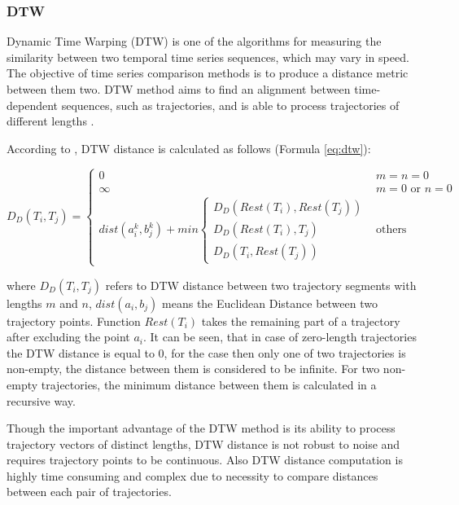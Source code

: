 \subsubsection{DTW}

Dynamic Time Warping (DTW) is one of the algorithms for measuring the similarity between two temporal time series sequences, which may vary in speed. The objective of time series comparison methods is to produce a distance metric between them two. DTW method aims to find an alignment between time-dependent sequences, such as trajectories, and is able to process trajectories of different lengths \cite{article:8_review_mot_cl_alg}. 

According to \cite{article:8_review_mot_cl_alg}, DTW distance is calculated as follows (Formula \ref{eq:dtw}):

\begin{equation} \label{eq:dtw}
	D_D(T_i, T_j) = 
		\begin{cases}
			0 				&\text{$m = n = 0$}\\
			\infty 			&\text{$m = 0$ or $n = 0$}\\
			dist(a_i^k, b_j^k) + min 
				\begin{cases}
					D_D(Rest(T_i), Rest(T_j))\\
					D_D(Rest(T_i), T_j)\\
					D_D(T_i, Rest(T_j))
				\end{cases} &\text{others}
		\end{cases}
\end{equation}

where $D_D(T_i, T_j)$ refers to DTW distance between two trajectory segments with lengths $m$ and $n$, $dist(a_i, b_j)$ means the Euclidean Distance between two trajectory points. Function $Rest(T_i)$ takes the remaining part of a trajectory after excluding the point $a_i$. It can be seen, that in case of zero-length trajectories the DTW distance is equal to 0, for the case then only one of two trajectories is non-empty, the distance between them is considered to be infinite. For two non-empty trajectories, the minimum distance between them is calculated in a recursive way.

Though the important advantage of the DTW method is its ability to process trajectory vectors of distinct lengths, DTW distance is not robust to noise and requires trajectory points to be continuous. Also DTW distance computation is highly time consuming and complex due to necessity to compare distances between each pair of trajectories.

